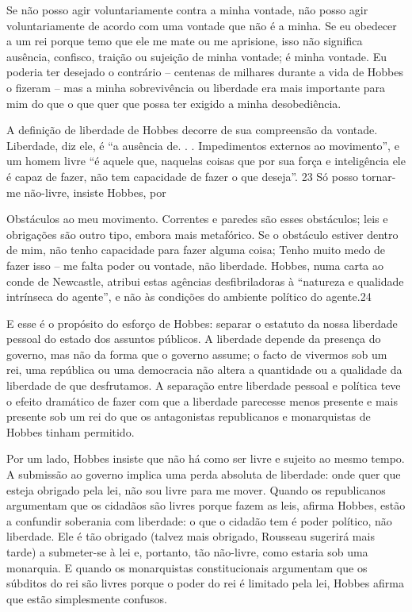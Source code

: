  \par 
Se não posso agir voluntariamente contra a minha vontade, não posso agir voluntariamente de acordo com uma vontade que não é a minha. Se eu obedecer a um rei porque temo que ele me mate ou me aprisione, isso não significa ausência, confisco, traição ou sujeição de minha vontade; é minha vontade. Eu poderia ter desejado o contrário – centenas de milhares durante a vida de Hobbes o fizeram – mas a minha sobrevivência ou liberdade era mais importante para mim do que o que quer que possa ter exigido a minha desobediência.
 \par 
A definição de liberdade de Hobbes decorre de sua compreensão da vontade. Liberdade, diz ele, é “a ausência de. . . Impedimentos externos ao movimento”, e um homem livre “é aquele que, naquelas coisas que por sua força e inteligência ele é capaz de fazer, não tem capacidade de fazer o que deseja”. {\color{blue}23} Só posso tornar-me não-livre, insiste Hobbes, por
 \par 
Obstáculos ao meu movimento. Correntes e paredes são esses obstáculos; leis e obrigações são outro tipo, embora mais metafórico. Se o obstáculo estiver dentro de mim, não tenho capacidade para fazer alguma coisa; Tenho muito medo de fazer isso – me falta poder ou vontade, não liberdade. Hobbes, numa carta ao conde de Newcastle, atribui estas agências desfibriladoras à “natureza e qualidade intrínseca do agente”, e não às condições do ambiente político do agente.{\color{blue}24}
 \par 
E esse é o propósito do esforço de Hobbes: separar o estatuto da nossa liberdade pessoal do estado dos assuntos públicos. A liberdade depende da presença do governo, mas não da forma que o governo assume; o facto de vivermos sob um rei, uma república ou uma democracia não altera a quantidade ou a qualidade da liberdade de que desfrutamos. A separação entre liberdade pessoal e política teve o efeito dramático de fazer com que a liberdade parecesse menos presente e mais presente sob um rei do que os antagonistas republicanos e monarquistas de Hobbes tinham permitido.
 \par 
Por um lado, Hobbes insiste que não há como ser livre e sujeito ao mesmo tempo. A submissão ao governo implica uma perda absoluta de liberdade: onde quer que esteja obrigado pela lei, não sou livre para me mover. Quando os republicanos argumentam que os cidadãos são livres porque fazem as leis, afirma Hobbes, estão a confundir soberania com liberdade: o que o cidadão tem é poder político, não liberdade. Ele é tão obrigado (talvez mais obrigado, Rousseau sugerirá mais tarde) a submeter-se à lei e, portanto, tão não-livre, como estaria sob uma monarquia. E quando os monarquistas constitucionais argumentam que os súbditos do rei são livres porque o poder do rei é limitado pela lei, Hobbes afirma que estão simplesmente confusos.

